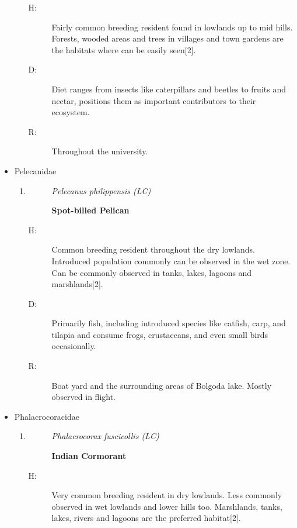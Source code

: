 \begin{itemize}
\begin{enumerate}
\begin{description}%
\item[H: ]%
Fairly common breeding resident found in lowlands up to mid hills. Forests, wooded areas and trees in villages and town gardens are the habitats where can be easily seen{[}2{]}.%
\item[D: ]%
Diet ranges from insects like caterpillars and beetles to fruits and nectar, positions them as important contributors to their ecosystem.%
\item[R: ]%
Throughout the university.%
\end{description}%
\end{enumerate}%
\item%
Pelecanidae%
\begin{enumerate}%
\item%
\begin{description}%
\item[]%
\textit{Pelecanus philippensis (LC)}%
\item[]%
\textbf{Spot{-}billed Pelican}%
\end{description}%
\begin{description}%
\item[H: ]%
Common breeding resident throughout the dry lowlands. Introduced population commonly can be observed in the wet zone.  Can be commonly observed in tanks, lakes, lagoons and marshlands{[}2{]}.%
\item[D: ]%
Primarily fish, including introduced species like catfish, carp, and tilapia and consume frogs, crustaceans, and even small birds occasionally.%
\item[R: ]%
Boat yard and the surrounding areas of Bolgoda lake. Mostly observed in flight.%
\end{description}%
\end{enumerate}%
\item%
Phalacrocoracidae%
\begin{enumerate}%
\item%
\begin{description}%
\item[]%
\textit{Phalacrocorax fuscicollis (LC)}%
\item[]%
\textbf{Indian Cormorant}%
\end{description}%
\begin{description}%
\item[H: ]%
Very common breeding resident in dry lowlands. Less commonly observed in wet lowlands and lower hills too. Marshlands, tanks, lakes, rivers and lagoons are the preferred habitat{[}2{]}.%

\end{description}
\end{enumerate}
\end{itemize}
